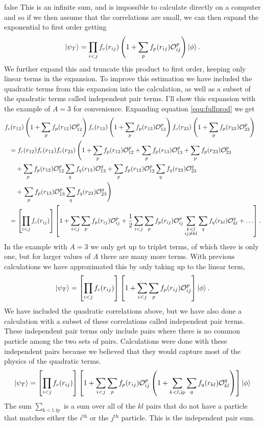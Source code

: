 \if false
This is an infinite sum, and is impossible to calculate directly on a computer and so if we then assume that the correlations are small, we can then expand the exponential to first order getting
\begin{equation}
   \left| \psi_T \right> = \prod\limits_{i<j}f_c(r_{ij}) \left(1+\sum\limits_pf_p(r_{ij})\mathcal{O}_{ij}^p\right) \left| \phi \right>.
   \label{equ:fullprod}
\end{equation}
We further expand this and truncate this product to first order, keeping only linear terms in the expansion. To improve this estimation we have included the quadratic terms from this expansion into the calculation, as well as a subset of the quadratic terms called independent pair terms. I'll show this expansion with the example of $A=3$ for convenience. Expanding equation \ref{equ:fullprod} we get
\begin{equation}
\begin{split}
   &f_{c}(r_{12})\left(1+\sum\limits_{p} f_{p}(r_{12})\mathcal{O}_{12}^{p}\right)f_{c}(r_{13})\left(1+\sum\limits_{p} f_{p}(r_{13})\mathcal{O}_{13}^{p}\right)f_{c}(r_{23})\left(1+\sum\limits_{p} f_{p}(r_{23})\mathcal{O}_{23}^{p}\right) \\
   &~~=f_{c}(r_{12})f_{c}(r_{13})f_{c}(r_{23})\left(1+\sum\limits_{p} f_{p}(r_{12})\mathcal{O}_{12}^{p}+\sum\limits_{p} f_{p}(r_{13})\mathcal{O}_{13}^{p}+\sum\limits_{p} f_{p}(r_{23})\mathcal{O}_{23}^{p}\right. \\
   &~~~~~+\sum\limits_{p} f_{p}(r_{12})\mathcal{O}_{12}^{p}\sum\limits_{q} f_{q}(r_{13})\mathcal{O}_{13}^{q}+\sum\limits_{p} f_{p}(r_{12})\mathcal{O}_{12}^{p}\sum\limits_{q} f_{q}(r_{23})\mathcal{O}_{23}^{q} \\
   &~~~~~+\left.\sum\limits_{p} f_{p}(r_{13})\mathcal{O}_{13}^{p}\sum\limits_{q} f_{q}(r_{23})\mathcal{O}_{23}^{q}\right) \\
   &~~= \left[\prod\limits_{i<j}f_{c}(r_{ij})\right]\left[1+\sum\limits_{i<j}\sum\limits_p f_p(r_{ij})\mathcal{O}_{ij}^p+\frac{1}{2}\sum\limits_{i<j}\sum\limits_p f_p(r_{ij})\mathcal{O}_{ij}^p\sum_{\substack{k<l\\ij \ne kl}}\sum\limits_q f_q(r_{kl})\mathcal{O}_{kl}^q + \ldots \right].
\end{split}
\end{equation}
In the example with $A=3$ we only get up to triplet terms, of which there is only one, but for larger values of $A$ there are many more terms. With previous calculations we have approximated this by only taking up to the linear term,
\begin{equation}
   \left| \psi_T \right> = \left[\prod\limits_{i<j}f_c(r_{ij})\right] \left[1+\sum\limits_{i<j}\sum\limits_p f_p(r_{ij})\mathcal{O}_{ij}^p\right] \left| \phi \right>.
\end{equation}
We have included the quadratic correlations above, but we have also done a calculation with a subset of these correlations called independent pair terms. These independent pair terms only include pairs where there is no common particle among the two sets of pairs. Calculations were done with these independent pairs because we believed that they would capture most of the physics of the quadratic terms. 
\begin{equation}
   \left| \psi_T \right> = \left[\prod\limits_{i<j}f_c(r_{ij})\right] \left[1+\sum\limits_{i<j}\sum\limits_p f_p(r_{ij})\mathcal{O}_{ij}^p\left(1 + \sum\limits_{k<l,\mathrm{ip}}\sum\limits_q f_q(r_{kl})\mathcal{O}_{kl}^q\right)\right] \left| \phi \right>
\end{equation}
The sum $\sum\limits_{\mathrm{k<l,ip}}$ is a sum over all of the $kl$ pairs that do not have a particle that matches either the $i^\mathrm{th}$ or the $j^\mathrm{th}$ particle. This is the independent pair sum.
\fi
